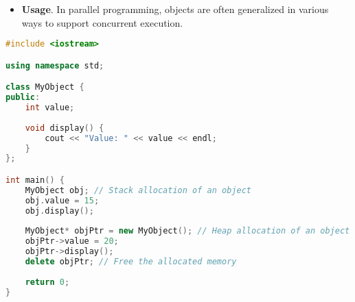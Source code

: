 \begin{enumerate}
\begin{itemize}
        \item[\textcolor{Green3}{\faIcon{question}}] \textcolor{Green3}{\textbf{Usage}}. In parallel programming, objects are often generalized in various ways to support concurrent execution.
    \end{itemize}
    \begin{examplebox}
        \begin{lstlisting}[language=c++]
#include <iostream>

using namespace std;

class MyObject {
public:
    int value;
    
    void display() {
        cout << "Value: " << value << endl;
    }
};

int main() {
    MyObject obj; // Stack allocation of an object
    obj.value = 15;
    obj.display();
    
    MyObject* objPtr = new MyObject(); // Heap allocation of an object
    objPtr->value = 20;
    objPtr->display();
    delete objPtr; // Free the allocated memory
    
    return 0;
}\end{lstlisting}
    \end{examplebox}
\end{enumerate}